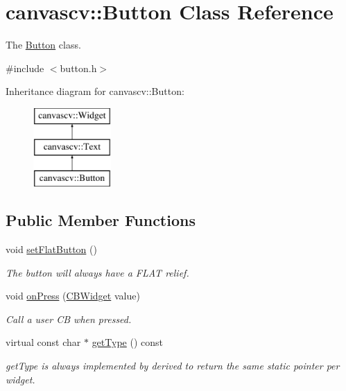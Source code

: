 \hypertarget{classcanvascv_1_1Button}{}\section{canvascv\+:\+:Button Class Reference}
\label{classcanvascv_1_1Button}


The \hyperlink{classcanvascv_1_1Button}{Button} class.  




{\ttfamily \#include $<$button.\+h$>$}

Inheritance diagram for canvascv\+:\+:Button\+:\begin{figure}[H]
\begin{center}
\leavevmode
\includegraphics[height=3.000000cm]{classcanvascv_1_1Button}
\end{center}
\end{figure}
\subsection*{Public Member Functions}
\begin{DoxyCompactItemize}
\item 
void \hyperlink{classcanvascv_1_1Button_a7d2c79daa9d22bf02c2cc978ff10df7e}{set\+Flat\+Button} ()\hypertarget{classcanvascv_1_1Button_a7d2c79daa9d22bf02c2cc978ff10df7e}{}\label{classcanvascv_1_1Button_a7d2c79daa9d22bf02c2cc978ff10df7e}

\begin{DoxyCompactList}\small\item\em The button will always have a F\+L\+AT relief. \end{DoxyCompactList}\item 
void \hyperlink{classcanvascv_1_1Button_a274f428bce039ba2159b78d790c3ed94}{on\+Press} (\hyperlink{classcanvascv_1_1Widget_ad27bca771ee1c14454c77c91d9d49925}{C\+B\+Widget} value)\hypertarget{classcanvascv_1_1Button_a274f428bce039ba2159b78d790c3ed94}{}\label{classcanvascv_1_1Button_a274f428bce039ba2159b78d790c3ed94}

\begin{DoxyCompactList}\small\item\em Call a user CB when pressed. \end{DoxyCompactList}\item 
virtual const char $\ast$ \hyperlink{classcanvascv_1_1Button_ace294c72ce39507268ffd752f4ca0034}{get\+Type} () const 
\begin{DoxyCompactList}\small\item\em get\+Type is always implemented by derived to return the same static pointer per widget. \end{DoxyCompactList}\end{DoxyCompactItemize}
